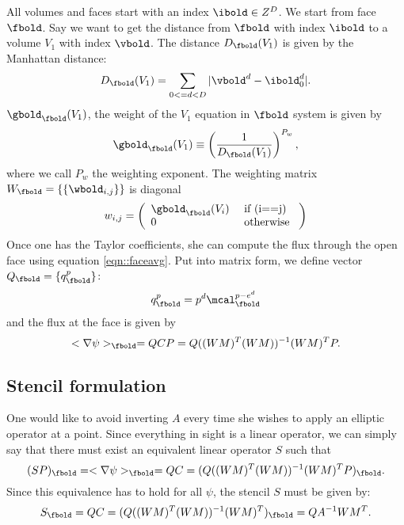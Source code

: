 \documentclass{article}
\begin{document}
{All volumes and faces  start with an  index $\ibold \in Z^D$.
We start from face $\fbold$.   Say we want to get
the distance from $\fbold$ with index $\ibold$ to a volume $V_1$
with index $\vbold$.  The distance $D_\fbold(V_1)$ is given by
the Manhattan distance:
\begin{equation}
  D_\fbold(V_1) = \sum\limits_{0 <= d < D} |\vbold^d - \ibold_0^d|.
\label{eqn::uptownFunk}
\end{equation}
$\gbold_\fbold(V_1)$, the weight of the $V_1$ equation in $\fbold$ system
is given by
\begin{equation}
  \gbold_\fbold(V_1)  \equiv \left(\frac{1}{D_\fbold(V_1) } \right)^{P_w},
\label{eqn::weightFunk}  
\end{equation}
where we call $P_w$ the weighting exponent.
The weighting matrix $W_\fbold = \{\{\wbold_{i,j}\}\}$ is diagonal
\begin{equation}
w_{i,j} =
\left(
\begin{array}{ll}
 \gbold_\fbold(V_i) & \mbox{ if } $(i==j)$ \\
 0   & \mbox{ otherwise }
\end{array}
\right)
\end{equation}
Once one has the Taylor coefficients, she can compute the flux through
the open face using  equation \ref{eqn::faceavg}.   Put into matrix
form, we define  vector  $Q_\fbold = \{q^p_\fbold\}$:
\begin{equation}
q^p_\fbold = p^d \mcal^{p-e^d}_\fbold
\end{equation}
and the flux at the face is given by
\begin{equation}
<\nabla \psi>_\fbold = Q C P= Q ((WM)^T(WM))^{-1} (WM)^T  P.
\end{equation}

\subsection{Stencil formulation}
One would like to avoid inverting $A$ every time she wishes to apply
an elliptic operator at a point.  Since everything in sight is a
linear operator, we can simply say that there must exist an equivalent
linear operator $S$ such that
\begin{equation}
(S P)_\fbold = <\nabla \psi>_\fbold = Q C= (Q ((WM)^T(WM))^{-1} (WM)^T  P)_\fbold.
\end{equation}
Since this equivalence has to hold for all $\psi$, the stencil $S$ must be
given by:
\begin{equation}
 S_\fbold = Q C = (Q ((WM)^T(WM))^{-1} (WM)^T  )_\fbold = Q A^{-1} WM^T.
\end{equation}

}
\end{document}
